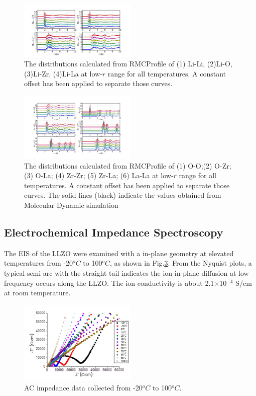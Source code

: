 \documentclass[twoside,twocolumn,9pt]{article}
\begin{document}
\begin{figure}
\centering
\includegraphics[width=0.5\textwidth]{Pics/partialPDFwithLi.pdf}
\caption{The distributions calculated from RMCProfile of (1) Li-Li, (2)Li-O, (3)Li-Zr, (4)Li-La at low-$r$ range for all temperatures. A constant offset has been applied to separate those curves.}
\label{fig:partialPDFwithLi}
\end{figure}

\begin{figure}
\centering
\includegraphics[width=0.5\textwidth]{Pics/partialPDFwithoutLi.pdf}
\caption{The distributions calculated from RMCProfile of (1) O-O;(2) O-Zr;(3) O-La; (4) Zr-Zr; (5) Zr-La; (6) La-La at low-$r$ range for all temperatures. A constant offset has been applied to separate those curves. The solid lines (black) indicate the values obtained from Molecular Dynamic simulation}
\label{fig:partialPDFwithoutLi}
\end{figure}


\subsection{Electrochemical Impedance Spectroscopy}

The EIS of the LLZO were examined with a in-plane geometry at elevated temperatures from -20$^oC$ to 100$^oC$, as shown in  Fig.\ref{fig:impedance}. 
From the Nyquist plots, a typical semi arc with the straight tail indicates the ion in-plane diffusion at low frequency occurs along the LLZO. 
The ion conductivity is about 2.1$\times$10$^{-4}$ S/cm at room temperature.

\begin{figure}
\centering
\includegraphics[width=0.5\textwidth]{Pics/impedance.png}
\caption{AC impedance data collected from -20$^oC$ to 100$^oC$.}
\label{fig:impedance}
\end{figure}
\end{document}
